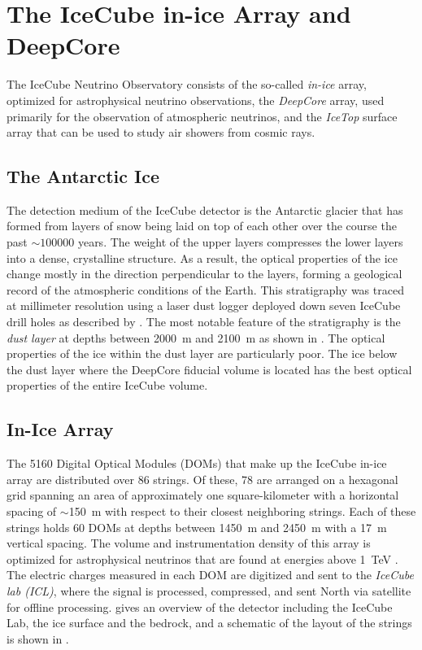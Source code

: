 \section{The IceCube in-ice Array and DeepCore}

The IceCube Neutrino Observatory consists of the so-called \emph{in-ice} array, optimized for astrophysical neutrino observations, the \emph{DeepCore} array, used primarily for the observation of atmospheric neutrinos, and the \emph{IceTop} surface array that can be used to study air showers from cosmic rays.

\subsection{The Antarctic Ice}

The detection medium of the IceCube detector is the Antarctic glacier that has formed from layers of snow being laid on top of each other over the course the past $\sim\num{100000}$ years.
The weight of the upper layers compresses the lower layers into a dense, crystalline structure.
As a result, the optical properties of the ice change mostly in the direction perpendicular to the layers, forming a geological record of the atmospheric conditions of the Earth.
This stratigraphy was traced at millimeter resolution using a laser dust logger deployed down seven IceCube drill holes as described by \cite{dustlogger}.
The most notable feature of the stratigraphy is the \emph{dust layer} at depths between 2000~m and 2100~m as shown in .
The optical properties of the ice within the dust layer are particularly poor.
The ice below the dust layer where the DeepCore fiducial volume is located has the best optical properties of the entire IceCube volume.

\subsection{In-Ice Array}
The 5160 Digital Optical Modules (DOMs) that make up the IceCube in-ice array are distributed over 86 strings.
Of these, 78 are arranged on a hexagonal grid spanning an area of approximately one square-kilometer with a horizontal spacing of $\sim$150~m with respect to their closest neighboring strings. Each of these strings holds 60 DOMs at depths between 1450~m and 2450~m with a 17~m vertical spacing.
The volume and instrumentation density of this array is optimized for astrophysical neutrinos that are found at energies above 1~TeV \cite{icecube_detector_17}.
The electric charges measured in each DOM are digitized  and sent to the \emph{IceCube lab (ICL)}, where the signal is processed, compressed, and sent North via satellite for offline processing.
 gives an overview of the detector including the IceCube Lab, the ice surface and the bedrock, and a schematic of the layout of the strings is shown in .

